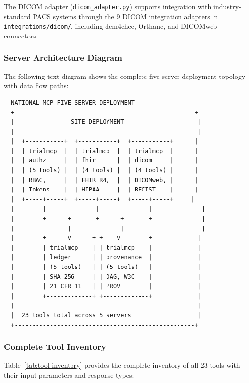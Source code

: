 \documentclass{article}
\begin{document}
The DICOM adapter (\texttt{dicom\_adapter.py}) supports integration with industry-standard PACS systems through the 9 DICOM integration adapters in \texttt{integrations/dicom/}, including dcm4chee, Orthanc, and DICOMweb connectors.

\subsubsection{Server Architecture Diagram}

The following text diagram shows the complete five-server deployment topology with data flow paths:

\begin{verbatim}
  NATIONAL MCP FIVE-SERVER DEPLOYMENT
  +---------------------------------------------------+
  |                SITE DEPLOYMENT                     |
  |                                                    |
  |  +-----------+  +-----------+  +-----------+      |
  |  | trialmcp  |  | trialmcp  |  | trialmcp  |      |
  |  | authz     |  | fhir      |  | dicom     |      |
  |  | (5 tools) |  | (4 tools) |  | (4 tools) |      |
  |  | RBAC,     |  | FHIR R4,  |  | DICOMweb, |      |
  |  | Tokens    |  | HIPAA     |  | RECIST    |      |
  |  +-----+-----+  +-----+-----+  +-----+-----+     |
  |        |              |              |              |
  |        +------+-------+------+-------+              |
  |               |              |                      |
  |        +------v------+ +----v--------+             |
  |        | trialmcp    | | trialmcp    |             |
  |        | ledger      | | provenance  |             |
  |        | (5 tools)   | | (5 tools)   |             |
  |        | SHA-256     | | DAG, W3C    |             |
  |        | 21 CFR 11   | | PROV        |             |
  |        +-------------+ +-------------+             |
  |                                                    |
  |  23 tools total across 5 servers                   |
  +---------------------------------------------------+
\end{verbatim}

\subsubsection{Complete Tool Inventory}

Table~\ref{tab:tool-inventory} provides the complete inventory of all 23 tools with their input parameters and response types:
\end{document}
